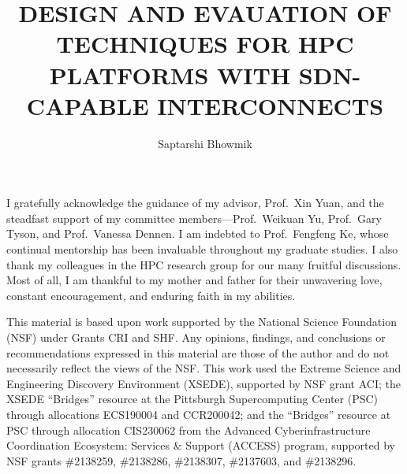 \documentclass[11pt,expanded,copyright]{fsuthesis}
\title{DESIGN AND EVAUATION OF TECHNIQUES FOR HPC PLATFORMS WITH SDN-CAPABLE INTERCONNECTS}
\author{Saptarshi Bhowmik}  %
\begin{document}
\frontmatter          %
\maketitle            %
\makecommitteepage    %

\begin{comment}
\begin{dedication}
\centering
To my parents, who always suspected I'd end up here
\end{dedication}
\end{comment}


\begin{acknowledgments}
I gratefully acknowledge the guidance of my advisor, Prof.\ Xin Yuan, and the steadfast support of my committee members—Prof.\ Weikuan Yu, Prof.\ Gary Tyson, and Prof.\ Vanessa Dennen. I am indebted to Prof.\ Fengfeng Ke, whose continual mentorship has been invaluable throughout my graduate studies. I also thank my colleagues in the HPC research group for our many fruitful discussions. Most of all, I am thankful to my mother and father for their unwavering love, constant encouragement, and enduring faith in my abilities.

This material is based upon work supported by the National Science Foundation (NSF) under Grants CRI and SHF. Any opinions, findings, and conclusions or recommendations expressed in this material are those of the author and do not necessarily reflect the views of the NSF. This work used the Extreme Science and Engineering Discovery Environment (XSEDE), supported by NSF grant ACI; the XSEDE ``Bridges'' resource at the Pittsburgh Supercomputing Center (PSC) through allocations ECS190004 and CCR200042; and the ``Bridges'' resource at PSC through allocation CIS230062 from the Advanced Cyberinfrastructure Coordination Ecosystem: Services \& Support (ACCESS) program, supported by NSF grants \#2138259, \#2138286, \#2138307, \#2137603, and \#2138296.
\end{acknowledgments}
\end{document}
